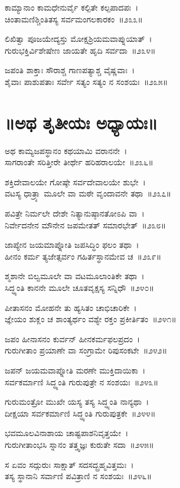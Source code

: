 ಕಾಮ್ಯಾನಾಂ ಕಾಮಧೇನುರ್ವೈ ಕಲ್ಪಿತೇ ಕಲ್ಪಪಾದಪಃ~।\\
ಚಿಂತಾಮಣಿಶ್ಚಿಂತಿತಸ್ಯ ಸರ್ವಮಂಗಲಕಾರಕಂ~॥೨೩೩॥

ಲಿಖಿತ್ವಾ ಪೂಜಯೇದ್ಯಸ್ತು ಮೋಕ್ಷಶ್ರಿಯಮವಾಪ್ನುಯಾತ್~।\\
ಗುರುಭಕ್ತಿರ್ವಿಶೇಷೇಣ ಜಾಯತೇ ಹೃದಿ ಸರ್ವದಾ~॥೨೩೪॥

ಜಪಂತಿ ಶಾಕ್ತಾಃ ಸೌರಾಶ್ಚ ಗಾಣಪತ್ಯಾಶ್ಚ ವೈಷ್ಣವಾಃ~।\\
ಶೈವಾಃ ಪಾಶುಪತಾಃ ಸರ್ವೇ ಸತ್ಯಂ ಸತ್ಯಂ ನ ಸಂಶಯಃ~॥೨೩೫॥


\section{॥ಅಥ ತೃತೀಯಃ ಅಧ್ಯಾಯಃ॥}

ಅಥ ಕಾಮ್ಯಜಪಸ್ಥಾನಂ ಕಥಯಾಮಿ ವರಾನನೇ~।\\
ಸಾಗರಾಂತೇ ಸರಿತ್ತೀರೇ ತೀರ್ಥೇ ಹರಿಹರಾಲಯೇ~॥೨೩೬॥

ಶಕ್ತಿದೇವಾಲಯೇ ಗೋಷ್ಠೇ ಸರ್ವದೇವಾಲಯೇ ಶುಭೇ~।\\
ವಟಸ್ಯ ಧಾತ್ರ್ಯಾ ಮೂಲೇ ವಾ ಮಠೇ ವೃಂದಾವನೇ ತಥಾ~॥೨೩೭॥

ಪವಿತ್ರೇ ನಿರ್ಮಲೇ ದೇಶೇ ನಿತ್ಯಾನುಷ್ಠಾನತೋಽಪಿ ವಾ~।\\
ನಿರ್ವೇದನೇನ ಮೌನೇನ ಜಪಮೇತತ್ ಸಮಾರಭೇತ್~॥೨೩೮॥

ಜಾಪ್ಯೇನ ಜಯಮಾಪ್ನೋತಿ ಜಪಸಿದ್ಧಿಂ ಫಲಂ ತಥಾ~।\\
ಹೀನಂ ಕರ್ಮ ತ್ಯಜೇತ್ಸರ್ವಂ ಗಹಿರ್ತಸ್ಥಾನಮೇವ ಚ~॥೨೩೯॥

ಶ್ಮಶಾನೇ ಬಿಲ್ವಮೂಲೇ ವಾ ವಟಮೂಲಾಂತಿಕೇ ತಥಾ~।\\
ಸಿದ್ಧ್ಯಂತಿ ಕಾನನೇ ಮೂಲೇ ಚೂತವೃಕ್ಷಸ್ಯ ಸನ್ನಿಧೌ~॥೨೪೦॥

ಪೀತಾಸನಂ ಮೋಹನೇ ತು ಹ್ಯಸಿತಂ ಚಾಭಿಚಾರಿಕೇ~।\\
ಜ್ಞೇಯಂ ಶುಕ್ಲಂ ಚ ಶಾಂತ್ಯರ್ಥಂ ವಶ್ಯೇ ರಕ್ತಂ ಪ್ರಕೀರ್ತಿತಂ~॥೨೪೧॥

ಜಪಂ ಹೀನಾಸನಂ ಕುರ್ವನ್ ಹೀನಕರ್ಮಫಲಪ್ರದಂ~।\\
ಗುರುಗೀತಾಂ ಪ್ರಯಾಣೇ ವಾ ಸಂಗ್ರಾಮೇ ರಿಪುಸಂಕಟೇ~॥೨೪೨॥

ಜಪನ್ ಜಯಮವಾಪ್ನೋತಿ ಮರಣೇ ಮುಕ್ತಿದಾಯಿಕಾ~।\\
ಸರ್ವಕರ್ಮಾಣಿ ಸಿದ್ಧ್ಯಂತಿ ಗುರುಪುತ್ರೇ ನ ಸಂಶಯಃ~॥೨೪೩॥

ಗುರುಮಂತ್ರೋ ಮುಖೇ ಯಸ್ಯ ತಸ್ಯ ಸಿದ್ಧ್ಯಂತಿ ನಾನ್ಯಥಾ~।\\
ದೀಕ್ಷಯಾ ಸರ್ವಕರ್ಮಾಣಿ ಸಿದ್ಧ್ಯಂತಿ ಗುರುಪುತ್ರಕೇ~॥೨೪೪॥

ಭವಮೂಲವಿನಾಶಾಯ ಚಾಷ್ಟಪಾಶನಿವೃತ್ತಯೇ~।\\
ಗುರುಗೀತಾಂಭಸಿ ಸ್ನಾನಂ ತತ್ತ್ವಜ್ಞಃ ಕುರುತೇ ಸದಾ~॥೨೪೫॥

ಸ ಏವಂ ಸದ್ಗುರುಃ ಸಾಕ್ಷಾತ್ ಸದಸದ್ಬ್ರಹ್ಮವಿತ್ತಮಃ~।\\
ತಸ್ಯ ಸ್ಥಾನಾನಿ ಸರ್ವಾಣಿ ಪವಿತ್ರಾಣಿ ನ ಸಂಶಯಃ~॥೨೪೬॥

